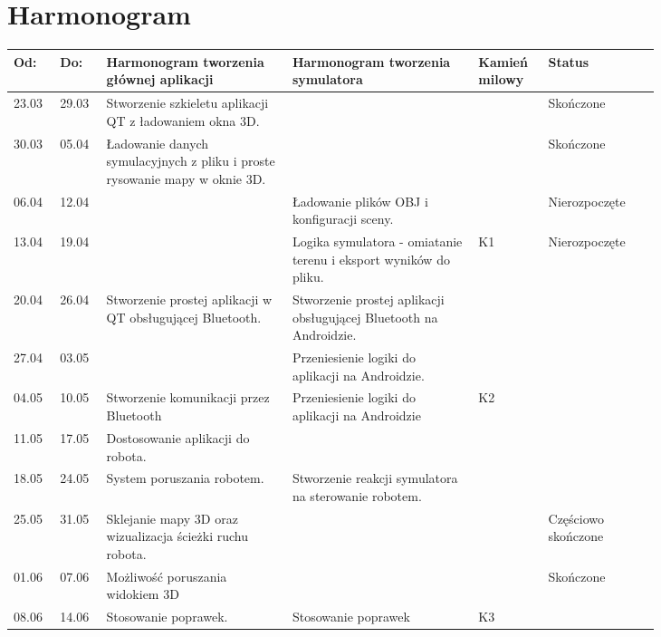 \documentclass[a4paper,12pt]{article}
\begin{document}
\section{Harmonogram}
\begin{longtable}{|p{0.05\linewidth}|p{0.05\linewidth}||p{0.25\linewidth}|p{0.25\linewidth}||p{0.08\linewidth}||p{0.15\linewidth}| }
\hline
\textbf{Od:} & \textbf{Do:} & \textbf{Harmonogram tworzenia głównej aplikacji} & \textbf{Harmonogram tworzenia symulatora} & \textbf{Kamień milowy} & \textbf{Status}\\ \hline \hline
23.03 & 29.03 & Stworzenie szkieletu aplikacji QT z ładowaniem okna 3D. & & & Skończone \\ \hline
30.03 & 05.04 & Ładowanie danych symulacyjnych z pliku i proste rysowanie mapy w oknie 3D. & & & Skończone \\ \hline
06.04 & 12.04 & & Ładowanie plików OBJ i konfiguracji sceny. & & Nierozpoczęte\\ \hline
13.04 & 19.04 & & Logika symulatora - omiatanie terenu i eksport wyników do pliku. & K1 & Nierozpoczęte\\ \hline \hline
20.04 & 26.04 & Stworzenie prostej aplikacji w QT obsługującej Bluetooth. & Stworzenie prostej aplikacji obsługującej Bluetooth na Androidzie. & & \\ \hline
27.04 & 03.05 & & Przeniesienie logiki do aplikacji na Androidzie. & & \\ \hline
04.05 & 10.05 & Stworzenie komunikacji przez Bluetooth & Przeniesienie logiki do aplikacji na Androidzie & K2 & \\ \hline \hline
11.05 & 17.05 & Dostosowanie aplikacji do robota. & & & \\ \hline
18.05 & 24.05 & System poruszania robotem. & Stworzenie reakcji symulatora na sterowanie robotem. & & \\ \hline
25.05 & 31.05 & Sklejanie mapy 3D oraz wizualizacja ścieżki ruchu robota. & & & Częściowo skończone \\ \hline
01.06 & 07.06 & Możliwość poruszania widokiem 3D & & & Skończone\\ \hline
08.06 & 14.06 & Stosowanie poprawek. & Stosowanie poprawek & K3 & \\ \hline
\end{longtable}
\end{document}
